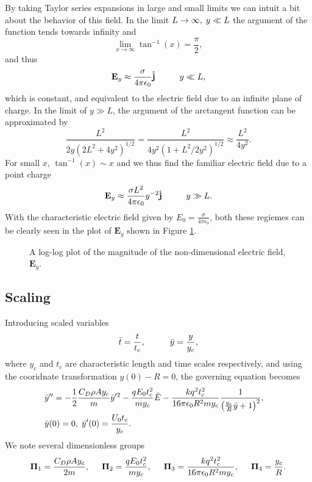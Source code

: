 \documentclass[a4paper, 12pt]{article}
\begin{document}
By taking Taylor series expansions in large and small limits we can intuit a bit about the behavior of this field. In the limit $L \rightarrow \infty, \hspace{1mm} y \ll L$ the argument of the function tends towards infinity and
\[ \lim_{x\to\infty} \tan^{-1}(x) = \frac{\pi}{2}
,\]
and thus
\begin{equation}
\mathbf{E}_y \approx \frac{\sigma}{4 \pi \epsilon_0} \hat{\mathbf{j}} \hspace{10mm} y \ll L
,\end{equation}
which is constant, and equivalent to the electric field due to an infinite plane of charge. In the limit of $y \gg L$, the argument of the arctangent function can be approximated by
\[ \frac{L^2}{2 y \left( 2 L^2 + 4 y^2\right)^{1/2}} = \frac{L^2}{4 y^2 \left( 1 + L^2/2y^2 \right)^{1/2}} \approx \frac{L^2}{4 y^2}
.\]
For small $x$, $\tan^{-1}(x) \sim x$ and we thus find the familiar electric field due to a point charge
\begin{equation}
\mathbf{E}_y \approx \frac{\sigma L^2}{4 \pi \epsilon_0} y^{-2} \hat{\mathbf{j}} \hspace{10mm} y \gg L
.\end{equation}
With the characteristic electric field given by $E_0 = \frac{\sigma}{4 \pi \epsilon_0}$, both these regiemes can be clearly seen in the plot of $\mathbf{E}_y$ shown in Figure \ref{fig:E0}.
\begin{figure}[htb]
    \centering
    
    \caption{A log-log plot of the magnitude of the non-dimensional electric field, $\mathbf{E}_y$.\label{fig:E0}}
\end{figure}



\subsection{Scaling}
Introducing scaled variables
\[ \bar{t} = \frac{t}{t_c}, \hspace{10 mm} \bar{y} = \frac{y}{y_c}, \]
where $y_c$ and $t_c$ are characteristic length and time scales respectively, and using the cooridnate transformation $y(0) - R = 0$, the governing equation becomes
\begin{eqnarray}
& \bar{y}'' = - \frac{1}{2} \frac{C_D \rho A y_c}{m} \bar{y}'^2
- \frac{q E_0 t_c^2}{m y_c} \bar{E} 
- \frac{k q^2 t_c^2}{16 \pi \epsilon_0 R^2 m y_c} \frac{1}{\left( \frac{y_c}{R} \bar{y} + 1 \right)^2}, & \nonumber \\
& \bar{y}(0) = 0, \hspace{1 mm} \bar{y}'(0) = \frac{U_0 t_c}{y_c} .&
\end{eqnarray}
We note several dimensionless groups
\[ \mathbf{\Pi}_1 = \frac{C_D \rho A y_c}{2 m}, \hspace{5 mm}
\mathbf{\Pi}_2 = \frac{q E_0 t_c^2}{m y_c}, \hspace{5 mm}
\mathbf{\Pi}_3 = \frac{k q^2 t_c^2}{16 \pi \epsilon_0 R^2 m y_c}, \hspace{5 mm}
\mathbf{\Pi}_4 = \frac{y_c}{R}.\]
\end{document}

